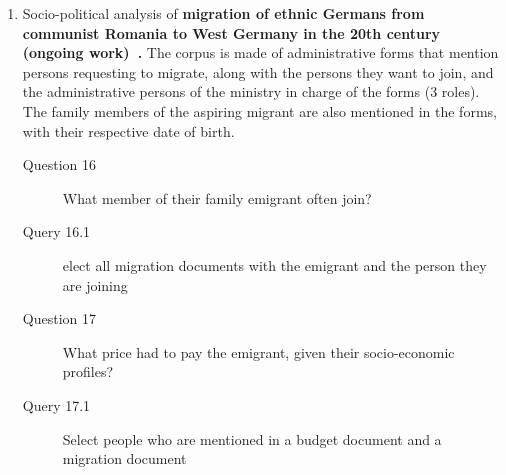 \begin{enumerate}
    \item Socio-political analysis of \textbf{migration of ethnic Germans from communist Romania to West Germany in the 20th century (ongoing work)~\cite{diminescu:hal-02556007}.}
    The corpus is made of administrative forms that mention persons requesting to migrate, along with the persons they want to join, and the administrative persons of the ministry in charge of the forms (3 roles).
    The family members of the aspiring migrant are also mentioned in the forms, with their respective date of birth.
    \begin{small}
        \begin{description}
            \item[Question 16] What member of their family emigrant often join?
            \item[\myindent Query 16.1] elect all migration documents with the emigrant and the person they are joining
            \item[Question 17] What price had to pay the emigrant, given their socio-economic profiles?
            \item[\myindent Query 17.1] Select people who are mentioned in a budget document and a migration document
        \end{description}
    \end{small}
\end{enumerate}


